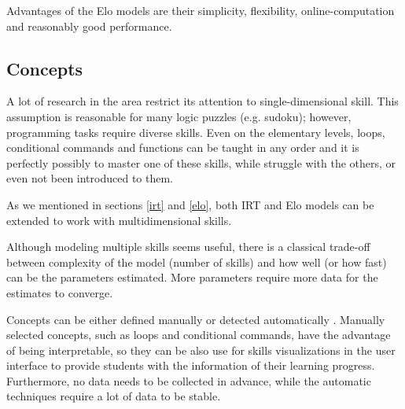 Advantages of the Elo models are their simplicity, flexibility,
online-computation and reasonably good performance.


\subsection{Concepts}


A lot of research in the area restrict its attention to single-dimensional skill.
This assumption is reasonable for many logic puzzles (e.g. sudoku);
however, programming tasks require diverse skills.
Even on the elementary levels, loops, conditional commands and functions
  can be taught in any order
  and it is perfectly possibly to master one of these skills,
  while struggle with the others, or even not been introduced to them.

As we mentioned in sections \ref{irt} and \ref{elo},
  both IRT and Elo models can be extended to work with multidimensional skills.

Although modeling multiple skills seems useful,
  there is a classical trade-off between complexity of the model (number of skills)
  and how well (or how fast) can be the parameters estimated.
More parameters require more data for the estimates to converge.



Concepts can be either defined manually or detected automatically
  \cite{niznan-thesis}.  %
Manually selected concepts, such as loops and conditional commands,
  have the advantage of being interpretable,
  so they can be also use for skills visualizations in the user interface
  to provide students with the information of their learning progress.
Furthermore, no data needs to be collected in advance,
  while the automatic techniques require a lot of data to be stable.  %


